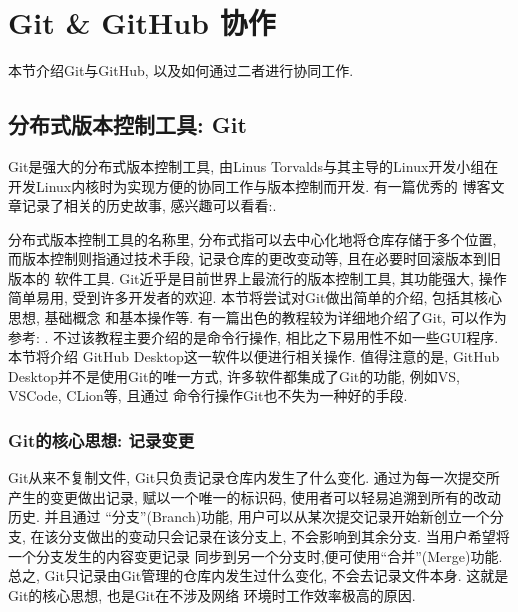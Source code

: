 \section{Git \& GitHub 协作}\label{GitGitHub}
本节介绍Git与GitHub, 以及如何通过二者进行协同工作.
\subsection{分布式版本控制工具: Git}
Git是强大的分布式版本控制工具, 由Linus Torvalds与其主导的Linux开发小组在开发Linux内核时为实现方便的协同工作与版本控制而开发. 有一篇优秀的
博客文章记录了相关的历史故事, 感兴趣可以看看:.

分布式版本控制工具的名称里, 分布式指可以去中心化地将仓库存储于多个位置, 而版本控制则指通过技术手段, 记录仓库的更改变动等, 且在必要时回滚版本到旧版本的
软件工具. Git近乎是目前世界上最流行的版本控制工具, 其功能强大, 操作简单易用, 受到许多开发者的欢迎. 本节将尝试对Git做出简单的介绍, 包括其核心思想, 基础概念
和基本操作等. 有一篇出色的教程较为详细地介绍了Git, 可以作为参考: . 不过该教程主要介绍的是命令行操作, 相比之下易用性不如一些GUI程序. 本节将介绍
GitHub Desktop这一软件以便进行相关操作. 值得注意的是, GitHub Desktop并不是使用Git的唯一方式, 许多软件都集成了Git的功能, 例如VS, VSCode, CLion等, 且通过
命令行操作Git也不失为一种好的手段.

\subsubsection{Git的核心思想: 记录变更}
Git从来不复制文件, Git只负责记录仓库内发生了什么变化. 通过为每一次提交所产生的变更做出记录, 赋以一个唯一的标识码, 使用者可以轻易追溯到所有的改动历史. 并且通过
``分支''(Branch)功能, 用户可以从某次提交记录开始新创立一个分支, 在该分支做出的变动只会记录在该分支上, 不会影响到其余分支. 当用户希望将一个分支发生的内容变更记录
同步到另一个分支时,便可使用``合并''(Merge)功能. 总之, Git只记录由Git管理的仓库内发生过什么变化, 不会去记录文件本身. 这就是Git的核心思想, 也是Git在不涉及网络
环境时工作效率极高的原因.
